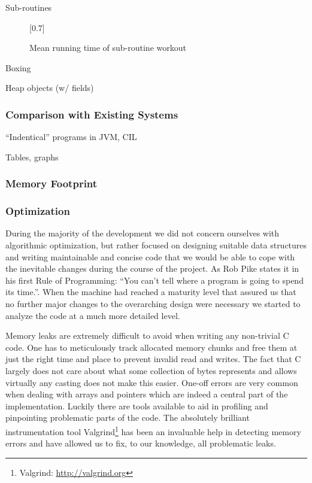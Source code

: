 
Sub-routines
\begin{figure}[H]
  \centering
  \scalebox{0.8}[0.7]{}
  \caption{Mean running time of sub-routine workout}
\end{figure}


Boxing


Heap objects (w/ fields)

\subsubsection{Comparison with Existing Systems}

``Indentical'' programs in JVM, CIL

Tables, graphs

\subsubsection{Memory Footprint}

\subsubsection{Optimization}

During the majority of the development we did not concern ourselves with
algorithmic optimization, but rather focused on designing suitable data
structures and writing maintainable and concise code that we would be able to
cope with the inevitable changes during the course of the project. As Rob Pike
states it in his first Rule of Programming: ``You can't tell where a program is
going to spend its time.''\cite{pike-rules}. When the machine had reached a
maturity level that assured us that no further major changes to the overarching
design were necessary we started to analyze the code at a much more detailed
level.

Memory leaks are extremely difficult to avoid when writing any non-trivial C
code. One has to meticulously track allocated memory chunks and free them at
just the right time and place to prevent invalid read and writes. The fact that
C largely does not care about what some collection of bytes represents and
allows virtually any casting does not make this easier. One-off errors are very
common when dealing with arrays and pointers which are indeed a central part of
the \thename{} implementation. Luckily there are tools available to aid in
profiling and pinpointing problematic parts of the code. The absolutely
brilliant instrumentation tool Valgrind\footnote{Valgrind:
  \url{http://valgrind.org}} has been an invaluable help in detecting memory
errors and have allowed us to fix, to our knowledge, all problematic leaks.


